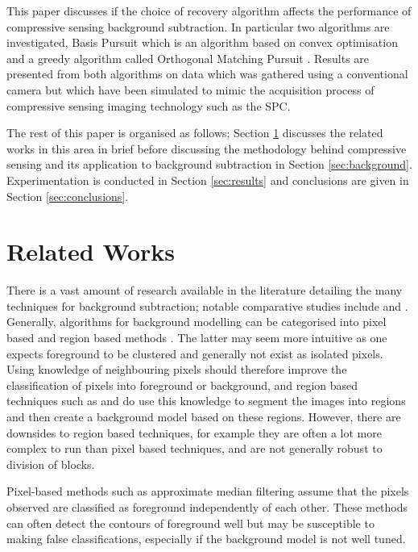 \documentclass[conference]{IEEEtran}
\begin{document}
This paper discusses if the choice of recovery algorithm affects the performance of compressive sensing background subtraction. In particular two algorithms are investigated, Basis Pursuit \cite{Candes2005} which is an algorithm based on convex optimisation \cite{boyd2004convex} and a greedy algorithm called Orthogonal Matching Pursuit \cite{tropp2004}. Results are presented from both algorithms on data which was gathered using a conventional camera but which have been simulated to mimic the acquisition process of compressive sensing imaging technology such as the SPC. 

The rest of this paper is organised as follows; Section \ref{sec:related-works} discusses the related works in this area in brief before discussing the methodology behind compressive sensing and its application to background subtraction in Section \ref{sec:background}. Experimentation is conducted in Section \ref{sec:results} and conclusions are given in Section \ref{sec:conclusions}. 


\section{Related Works}
\label{sec:related-works}

There is a vast amount of research available  in the literature detailing the many techniques for background subtraction; notable comparative studies include \cite{Sen-Ching2004} and \cite{Piccardi2004a}. Generally, algorithms for background modelling  can be categorised into pixel based and region based methods  \cite{Bouwmans2011}. The latter may seem more intuitive as one expects foreground to be clustered and generally not exist as isolated pixels. Using knowledge of neighbouring pixels should therefore improve the classification of pixels into foreground or background, and region based techniques such as  \cite{elgammal2000} and \cite{toyama1999} do use this knowledge to segment the images into regions and then create a background model based on these regions. However, there are downsides to region based techniques, for example they are often a lot more complex to run than pixel based techniques, and are not generally robust to division of blocks.

Pixel-based methods such as approximate median filtering \cite{McFarlane1995} assume that the pixels observed are classified as foreground independently of each other. These methods can often detect the contours of foreground well but may be susceptible to making false classifications, especially if the background model is not well tuned.  
\end{document}

